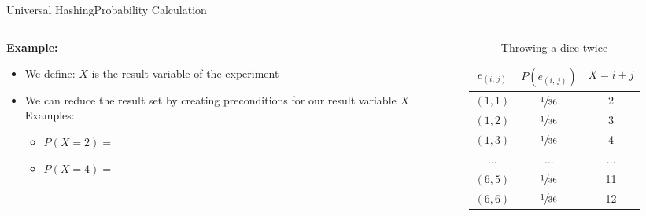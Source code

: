 \begin{frame}{Universal Hashing}{Probability Calculation}
  \begin{columns}
    \begin{column}{0.55\linewidth}
      \textbf{Example:}
      \begin{itemize}
        \item
          We define: $X$ is the result variable of the experiment
        \item
          We can reduce the result set by creating preconditions for our
          result variable $X$\\[0.5em]
          Examples:
          \begin{itemize}
            \item
              $P(X = 2) = $
            \item
              $P(X = 4) = $
          \end{itemize}
      \end{itemize}
    \end{column}
    \begin{column}{0.45\linewidth}
      \begin{table}[!h]
        \caption{Throwing a dice twice}
        \label{tab:probabilities:rolling_dice_twice2}
        \begin{tabularx}{0.95\linewidth}{c|cc}
          $e_{(i,\,j)}$ & $P(e_{(i,\,j)})$ & $X = i + j$\\
          \midrule
          $(1, 1)$ & $\sfrac{1}{36}$ & 2\\
          $(1, 2)$ & $\sfrac{1}{36}$ & 3\\
          $(1, 3)$ & $\sfrac{1}{36}$ & 4\\
          $\dots$ & $\dots$ & $\dots$\\
          $(6, 5)$ & $\sfrac{1}{36}$ & 11\\
          $(6, 6)$ & $\sfrac{1}{36}$ & 12\\
        \end{tabularx}
      \end{table}
    \end{column}
  \end{columns}
\end{frame}


